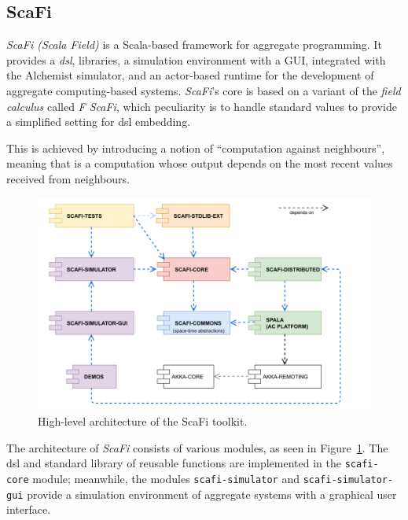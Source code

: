 \subsection{ScaFi}
\label{subsec:scafi}


\emph{ScaFi (Scala Field)} is a Scala-based framework for aggregate programming.
It provides a \emph{\ac{dsl}}, libraries, a simulation environment with a GUI, integrated with the
Alchemist simulator, and an actor-based runtime for the development of aggregate computing-based systems.
\emph{ScaFi}'s core is based on a variant of the \emph{field calculus} called \emph{F ScaFi}, which peculiarity
is to handle standard values to provide a simplified setting for \ac{dsl} embedding.

This is achieved by introducing a notion of ``computation against neighbours'', meaning that is a computation whose
output depends on the most recent values received from neighbours.

\begin{figure}
    \centering
    \includegraphics[width=.8\linewidth]{figures/scafi_structure}
    \caption{High-level architecture of the ScaFi toolkit.}
    \label{fig:scafi-structure}
\end{figure}

The architecture of \emph{ScaFi} consists of various modules, as seen in Figure~\ref{fig:scafi-structure}.
The \ac{dsl} and standard library of reusable functions are implemented in the \texttt{scafi-
core} module; meanwhile, the modules \texttt{scafi-simulator} and \texttt{scafi-simulator-gui} provide a simulation
environment of aggregate systems with a graphical user interface.

